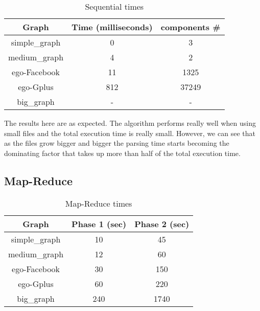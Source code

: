 \begin{table}[!h]
\footnotesize
\begin{center}
\begin{tabular}{|c|c|c|}
\hline
{\bf Graph} & {\bf Time (milliseconds)}& {\bf components \#} \\
\hline
\hline
simple\_graph   & 0  & 3  \\
\hline
medium\_graph   & 4  & 2   \\
\hline
ego-Facebook   & 11  & 1325  \\
\hline
ego-Gplus   & 812 & 37249 \\
\hline
big\_graph   & -  & -  \\
\hline
\end{tabular}
\caption{Sequential times}
\label{tb:sequentialtimes}
\end{center}
\end{table}

The results here are as expected. The algorithm performs really well when using small files and the total execution time is really small. However, we can see that as the files grow bigger and bigger the parsing time starts becoming the dominating factor that takes up more than half of the total execution time.

\subsection{Map-Reduce}

\begin{table}[h!]
\footnotesize
\begin{center}
\begin{tabular}{|c|c|c|}
\hline
{\bf Graph} & {\bf Phase 1 (sec)} & {\bf Phase 2 (sec)}\\
\hline
\hline
simple\_graph   & 10  & 45 \\
\hline
medium\_graph   & 12 & 60 \\
\hline
ego-Facebook   & 30 & 150 \\
\hline
ego-Gplus   & 60  & 220 \\
\hline
big\_graph   & 240 & 1740 \\
\hline
\end{tabular}
\caption{Map-Reduce times}
\label{tb:MapReducetimes}
\end{center}
\end{table}
